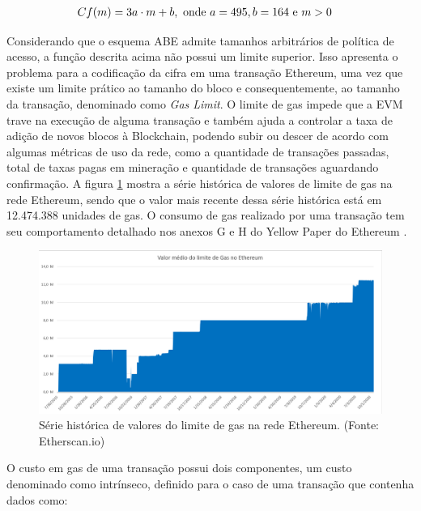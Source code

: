 \documentclass[a4paper,11pt]{article}
\begin{document}
\begin{equation}
  \begin{aligned}
    Cf(m) & =  3 a \cdot m + b, \textnormal{ onde } a = 495, b = 164 \textnormal{ e } m > 0
  \end{aligned}
\end{equation}

Considerando que o esquema ABE admite tamanhos arbitrários de política de acesso, a função descrita acima não possui um limite superior.
Isso apresenta o problema para a codificação da cifra em uma transação Ethereum, uma vez que existe um limite prático ao tamanho do bloco e consequentemente, ao tamanho da transação, denominado como \emph{Gas Limit}.
O limite de gas impede que a EVM trave na execução de alguma transação e também ajuda a controlar a taxa de adição de novos blocos à Blockchain, podendo subir ou descer de acordo com algumas métricas de uso da rede, como a quantidade de transações passadas, total de taxas pagas em mineração e quantidade de transações aguardando confirmação.
A figura \ref{fig:serie-gasLimit} mostra a série histórica de valores de limite de gas na rede Ethereum, sendo que o valor mais recente dessa série histórica está em 12.474.388 unidades de gas.
O consumo de gas realizado por uma transação tem seu comportamento detalhado nos anexos G e H do Yellow Paper do Ethereum \cite{Wood2017}.

\begin{figure}[!h]
  \centering
  \includegraphics[width=\textwidth]{images/gasLimit.png}
  \caption{Série histórica de valores do limite de gas na rede Ethereum. (Fonte: Etherscan.io)}
  \label{fig:serie-gasLimit}
\end{figure}

O custo em gas de uma transação possui dois componentes, um custo denominado como intrínseco, definido para o caso de uma transação que contenha dados como:
\end{document}
